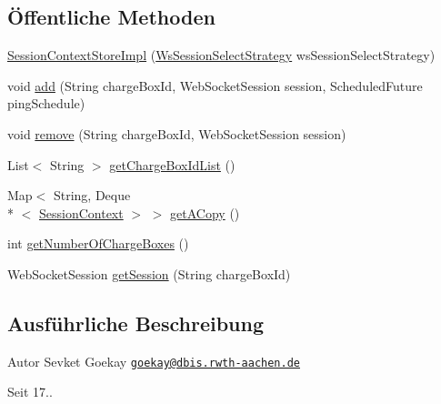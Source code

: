 \subsection*{Öffentliche Methoden}
\begin{DoxyCompactItemize}
\item 
\hyperlink{classde_1_1rwth_1_1idsg_1_1steve_1_1ocpp_1_1ws_1_1_session_context_store_impl_a2430b711af31c8bc15fc5597a87417dc}{Session\+Context\+Store\+Impl} (\hyperlink{interfacede_1_1rwth_1_1idsg_1_1steve_1_1ocpp_1_1ws_1_1custom_1_1_ws_session_select_strategy}{Ws\+Session\+Select\+Strategy} ws\+Session\+Select\+Strategy)
\item 
void \hyperlink{classde_1_1rwth_1_1idsg_1_1steve_1_1ocpp_1_1ws_1_1_session_context_store_impl_a2225d8697d71978cac5ecf1962d76d72}{add} (String charge\+Box\+Id, Web\+Socket\+Session session, Scheduled\+Future ping\+Schedule)
\item 
void \hyperlink{classde_1_1rwth_1_1idsg_1_1steve_1_1ocpp_1_1ws_1_1_session_context_store_impl_a1d7770d143641dbfccf297b03f6f23fc}{remove} (String charge\+Box\+Id, Web\+Socket\+Session session)
\item 
List$<$ String $>$ \hyperlink{classde_1_1rwth_1_1idsg_1_1steve_1_1ocpp_1_1ws_1_1_session_context_store_impl_a04306c85b200069137e828a1d6db8560}{get\+Charge\+Box\+Id\+List} ()
\item 
Map$<$ String, Deque\\*
$<$ \hyperlink{classde_1_1rwth_1_1idsg_1_1steve_1_1ocpp_1_1ws_1_1data_1_1_session_context}{Session\+Context} $>$ $>$ \hyperlink{classde_1_1rwth_1_1idsg_1_1steve_1_1ocpp_1_1ws_1_1_session_context_store_impl_ac17f07b4be357aec023b01f6298a3dc3}{get\+A\+Copy} ()
\item 
int \hyperlink{classde_1_1rwth_1_1idsg_1_1steve_1_1ocpp_1_1ws_1_1_session_context_store_impl_ab364234851cdf7f0721154e5986f77b9}{get\+Number\+Of\+Charge\+Boxes} ()
\item 
Web\+Socket\+Session \hyperlink{classde_1_1rwth_1_1idsg_1_1steve_1_1ocpp_1_1ws_1_1_session_context_store_impl_a81bf3419fb5de7a16bff8a6adc5546ee}{get\+Session} (String charge\+Box\+Id)
\end{DoxyCompactItemize}


\subsection{Ausführliche Beschreibung}
\begin{DoxyAuthor}{Autor}
Sevket Goekay \href{mailto:goekay@dbis.rwth-aachen.de}{\tt goekay@dbis.\+rwth-\/aachen.\+de} 
\end{DoxyAuthor}
\begin{DoxySince}{Seit}
17.. 
\end{DoxySince}


